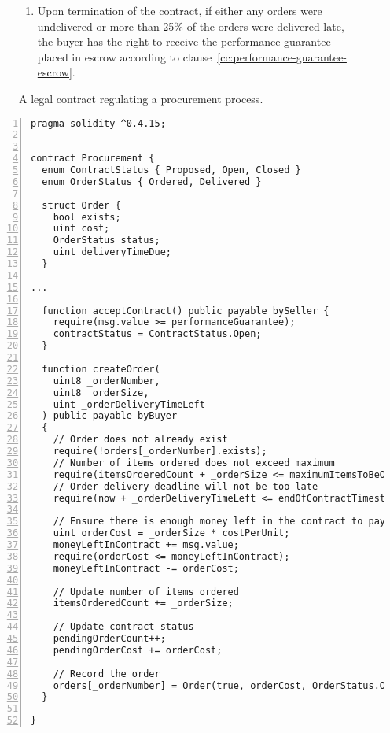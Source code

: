 \documentclass{article}
\begin{document}
\begin{figure}[t]
{\begin{enumerate}
     \item Upon termination of the contract, if either any orders were undelivered or more than 25\% of the orders were delivered late, the buyer has the right to receive the performance guarantee placed in escrow according to clause~\ref{cc:performance-guarantee-escrow}. %
    \end{enumerate}
    }\normalsize
    \vspace{-2ex}
    \caption{A legal contract regulating a procurement process.}
    \label{f:legal-contract-procurement}
    \end{figure}
    
    \small\begin{lstlisting}[language=DEA,basicstyle=\scriptsize,numbers=left,numbersep=2pt,xleftmargin=0.3cm,label={lt:courierservice},caption={Excerpt from procument smart contract.}]
pragma solidity ^0.4.15;


contract Procurement {
  enum ContractStatus { Proposed, Open, Closed }
  enum OrderStatus { Ordered, Delivered }

  struct Order {
    bool exists;
    uint cost;
    OrderStatus status;
    uint deliveryTimeDue;
  }

...

  function acceptContract() public payable bySeller {
    require(msg.value >= performanceGuarantee);
    contractStatus = ContractStatus.Open;
  }

  function createOrder(
    uint8 _orderNumber,
    uint8 _orderSize,
    uint _orderDeliveryTimeLeft
  ) public payable byBuyer 
  {
    // Order does not already exist
    require(!orders[_orderNumber].exists);
    // Number of items ordered does not exceed maximum
    require(itemsOrderedCount + _orderSize <= maximumItemsToBeOrdered);
    // Order delivery deadline will not be too late
    require(now + _orderDeliveryTimeLeft <= endOfContractTimestamp);

    // Ensure there is enough money left in the contract to pay for the order
    uint orderCost = _orderSize * costPerUnit;
    moneyLeftInContract += msg.value;
    require(orderCost <= moneyLeftInContract);
    moneyLeftInContract -= orderCost;
    
    // Update number of items ordered
    itemsOrderedCount += _orderSize;

    // Update contract status
    pendingOrderCount++;
    pendingOrderCost += orderCost;

    // Record the order
    orders[_orderNumber] = Order(true, orderCost, OrderStatus.Ordered, now+_orderDeliveryTimeLeft);
  }

}
    \end{lstlisting}\normalsize
    
\end{document}
